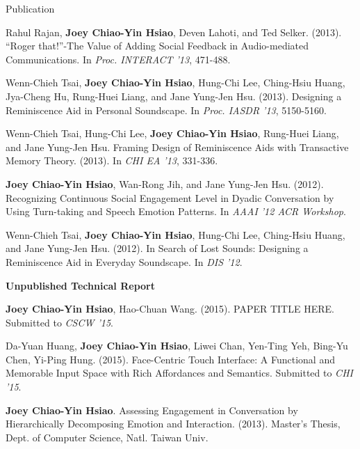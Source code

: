 \documentclass{resume} %
\begin{document}
\begin{rSection}{Publication}

\item Rahul Rajan, \textbf{Joey Chiao-Yin Hsiao}, Deven Lahoti, and Ted Selker. (2013). 
``Roger that!''-The Value of Adding Social Feedback in Audio-mediated Communications. 
In \textit{Proc. INTERACT '13}, 471-488.

\item Wenn-Chieh Tsai, \textbf{Joey Chiao-Yin Hsiao}, Hung-Chi Lee, Ching-Hsiu Huang, 
Jya-Cheng Hu, Rung-Huei Liang, and Jane Yung-Jen Hsu. (2013). 
Designing a Reminiscence Aid in Personal Soundscape. In \textit{Proc. IASDR '13}, 5150-5160.

\item Wenn-Chieh Tsai, Hung-Chi Lee, \textbf{Joey Chiao-Yin Hsiao}, Rung-Huei Liang, and Jane Yung-Jen Hsu. 
Framing Design of Reminiscence Aids with Transactive Memory Theory. (2013). 
In \textit{CHI EA '13}, 331-336.

\item \textbf{Joey Chiao-Yin Hsiao}, Wan-Rong Jih, and Jane Yung-Jen Hsu. (2012). 
Recognizing Continuous Social Engagement Level in Dyadic Conversation by Using Turn-taking and Speech Emotion Patterns. 
In \textit {AAAI '12 ACR Workshop}.

\item Wenn-Chieh Tsai, \textbf{Joey Chiao-Yin Hsiao}, Hung-Chi Lee, Ching-Hsiu Huang, and Jane Yung-Jen Hsu. (2012). 
In Search of Lost Sounds: Designing a Reminiscence Aid in Everyday Soundscape. 
In \textit{DIS '12}.

\textbf{Unpublished Technical Report}

\item \textbf{Joey Chiao-Yin Hsiao}, Hao-Chuan Wang. (2015). 
PAPER TITLE HERE. 
Submitted to \textit{CSCW '15}.

\item Da-Yuan Huang, \textbf{Joey Chiao-Yin Hsiao}, Liwei Chan, Yen-Ting Yeh, Bing-Yu Chen, Yi-Ping Hung.
(2015). Face-Centric Touch Interface: A Functional and Memorable Input Space with Rich Affordances and Semantics. 
Submitted to \textit{CHI '15}.

\item \textbf{Joey Chiao-Yin Hsiao}. Assessing Engagement in Conversation by Hierarchically Decomposing Emotion and Interaction. (2013). 
Master’s Thesis, Dept. of Computer Science, Natl. Taiwan Univ.

\end{rSection}
\end{document}

